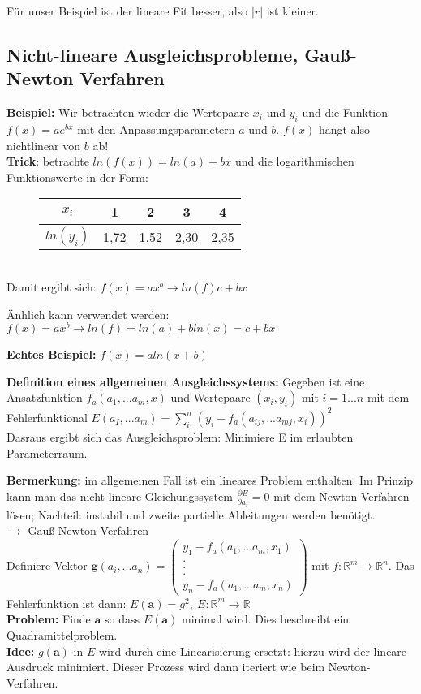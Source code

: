 \documentclass{scrartcl}
\begin{document}
Für unser Beispiel ist der lineare Fit besser, also $|r|$ ist kleiner.

\subsection{Nicht-lineare Ausgleichsprobleme, Gauß-Newton Verfahren}
\textbf{Beispiel:} Wir betrachten wieder die Wertepaare $x_i$ und $y_i$ und die Funktion $f(x)=a e^{bx}$ mit den Anpassungsparametern $a$ und $b$. $f(x)$ hängt also nichtlinear von $b$ ab! \\
\textbf{Trick}: betrachte $ln(f(x))=ln(a)+b x$ und die logarithmischen Funktionswerte in der Form: \begin{figure}
\center

\begin{tabular}{|c||c|c|c|c|}

$x_i$ & 1 & 2 & 3 & 4 \\ 
\hline 
$ln(y_i)$ & 1,72 & 1,52 & 2,30 & 2,35\\ 

\end{tabular}
\end{figure}\\
Damit ergibt sich: $f(x)= a x^b \rightarrow ln(f) c+ b x$

Änhlich kann verwendet werden: $f(x) = a x^b \rightarrow ln(f) = ln(a) + b ln(x) = c + b \tilde{x}$

\textbf{Echtes Beispiel:} $f(x)=a ln(x+b)$

\textbf{Definition eines allgemeinen Ausgleichssystems:} Gegeben ist eine Ansatzfunktion $f_a(a_1,... a_m, x)$ und Wertepaare $(x_i,y_i)$ mit $i=1...n$ mit dem Fehlerfunktional $E(a_I,...a_m) = \sum_{i_1}^n (y_i -f_a(a_{ij},...a_{mj},x_i))^2$\\
Dasraus ergibt sich das Ausgleichsproblem: Minimiere E im erlaubten Parameterraum.

\textbf{Bermerkung:} im allgemeinen Fall ist ein lineares Problem enthalten. Im Prinzip kann man das nicht-lineare Gleichungssystem $\frac{\partial E}{\partial a_i}=0$ mit dem Newton-Verfahren lösen; Nachteil: instabil und zweite partielle Ableitungen werden benötigt.\\
$\rightarrow$ Gauß-Newton-Verfahren \\
Definiere Vektor $\boldsymbol{g}(a_i,... a_n) = \begin{pmatrix}
y_1-f_a(a_1,... a_m, x_1)\\
.\\
.\\
.\\
y_n-f_a(a_1,... a_m, x_n)
\end{pmatrix}$ mit $f: \mathbb{R}^m \rightarrow \mathbb{R}^n$.
Das Fehlerfunktion ist dann: $E(\boldsymbol{a})=g^2, \ E:\mathbb{R}^m \rightarrow \mathbb{R}$\\
\textbf{Problem:} Finde $\boldsymbol{a}$ so dass $E(\boldsymbol{a})$ minimal wird. Dies beschreibt ein Quadramittelproblem. \\
\textbf{Idee:} $g(\boldsymbol{a})$ in $E$ wird durch eine Linearisierung ersetzt:
hierzu wird der lineare Ausdruck minimiert.
Dieser Prozess wird dann iteriert wie beim Newton-Verfahren.
\end{document}
